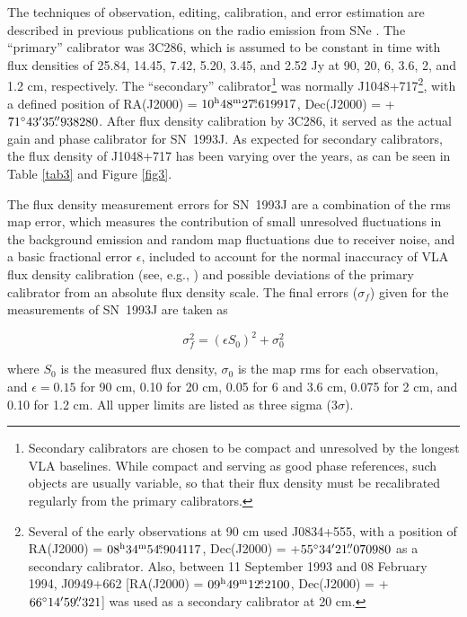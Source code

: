 \documentclass[12pt,preprint]{aastex}
\begin{document}
The techniques of observation, editing, calibration, and error
estimation are described in previous publications on the radio emission
from SNe \citep[see, e.g., ][]{Weiler86,Weiler90}.  The ``primary''
calibrator was 3C286, which is assumed to be constant in time with flux
densities of 25.84, 14.45, 7.42, 5.20, 3.45, and 2.52 Jy at 90, 20, 6,
3.6, 2, and 1.2 cm, respectively.  The ``secondary''
calibrator\footnote{Secondary calibrators are chosen to be compact and
unresolved by the longest VLA baselines.  While compact and serving as
good phase references, such objects are usually variable, so that their
flux density must be recalibrated regularly from the primary calibrators.} was normally J1048+717\footnote{Several of the early
observations at 90 cm used J0834+555, with a position of RA(J2000) =
$08^{\rm h}34^{\rm m}54{\mbox{$.\!\!^{\mathrm s}$}}904117$, Dec(J2000) = +$55^{\circ}34\mbox{$^\prime$}
21{\mbox{$.\!\!^{\prime\prime}$}}070980$ as a secondary calibrator. Also, between 11 September 1993 and 08 February 1994, J0949+662 [RA(J2000) = $09^{\rm h}49^{\rm m}12{\mbox{$.\!\!^{\mathrm s}$}}2100$, Dec(J2000) = +$66^{\circ}14\mbox{$^\prime$}
59{\mbox{$.\!\!^{\prime\prime}$}}321$] was used as a secondary calibrator at 20 cm.}, with a defined position
of RA(J2000) = $10^{\rm h}48^{\rm m}27{\mbox{$.\!\!^{\mathrm s}$}}619917$, Dec(J2000) =  
+$71^{\circ}43\mbox{$^\prime$} 35{\mbox{$.\!\!^{\prime\prime}$}}938280$.  After flux density calibration
by 3C286, it served as the actual gain and phase calibrator for
SN~1993J.  As expected for secondary calibrators, the flux density of
J1048+717 has been varying over the years, as can be seen in Table
\ref{tab3} and Figure \ref{fig3}.

The flux density measurement errors for SN~1993J are a combination of
the rms map error, which measures the contribution of small unresolved
fluctuations in the background emission and random map fluctuations due
to receiver noise, and a basic fractional error $\epsilon$, included to
account for the normal inaccuracy of VLA flux density calibration (see,
e.g., \citealt{Weiler86}) and possible deviations of the primary
calibrator from an absolute flux density scale.  The final errors
($\sigma_f$) given for the measurements of SN~1993J are taken as

\begin{equation}
\label{eq1}
\sigma_{f}^{2} = (\epsilon S_0)^2+\sigma_{0}^2 
\end{equation} 

\noindent where $S_0$ is the measured flux density, $\sigma_0$ is the
map rms for each observation, and $\epsilon = 0.15$ for 90 cm, 0.10 for
20 cm, 0.05 for 6 and 3.6 cm, 0.075 for 2 cm, and 0.10 for 1.2 cm. All
upper limits are listed as three sigma ($3\sigma$). 
\end{document}
